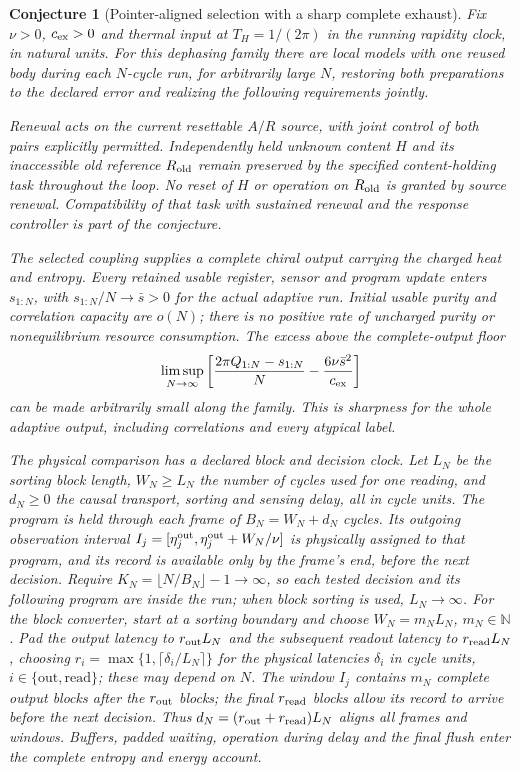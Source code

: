 \documentclass[12pt,a4paper]{article}
\newtheorem{conjecture}[theorem]{Conjecture}
\begin{document}
\begin{conjecture}[Pointer-aligned selection with a sharp complete exhaust]
\label{conj:gravitating}
Fix $\nu>0$, $c_{\rm ex}>0$ and thermal input at $T_H=1/(2\pi)$ in the
running rapidity clock, in natural units. For this dephasing family there
are local models with one reused body during each $N$-cycle run, for
arbitrarily large $N$, restoring both preparations to the declared error
and realizing the following requirements jointly.

Renewal acts on the current resettable $A/R$ source, with joint control
of both pairs explicitly permitted. Independently held unknown content
$H$ and its inaccessible old reference $R_{\rm old}$ remain preserved
by the specified content-holding task throughout the loop. No reset of
$H$ or operation on $R_{\rm old}$ is granted by source renewal.
Compatibility of that task with sustained renewal and the response
controller is part of the conjecture.

The selected coupling supplies a complete chiral output carrying the
charged heat and entropy. Every retained usable register, sensor and
program update enters $s_{1:N}$, with $s_{1:N}/N\to\bar s>0$ for the
actual adaptive run. Initial usable purity and correlation capacity are
$o(N)$; there is no positive rate of uncharged purity or nonequilibrium
resource consumption. The excess above the complete-output floor
\begin{equation}
 \limsup_{N\to\infty}\left[
 \frac{2\pi Q_{1:N}-s_{1:N}}{N}
 -\frac{6\nu\bar s^2}{c_{\rm ex}}\right]
 \label{eq:sharp-exhaust}
\end{equation}
can be made arbitrarily small along the family. This is sharpness for
the whole adaptive output, including correlations and every atypical label.

The physical comparison has a declared block and decision clock.
Let $L_N$ be the sorting block length, $W_N\ge L_N$ the number of
cycles used for one reading, and $d_N\ge0$ the causal transport,
sorting and sensing delay, all in cycle units. The program is held
through each frame of $B_N=W_N+d_N$ cycles. Its outgoing observation
interval $I_j=[\eta_j^{\rm out},\eta_j^{\rm out}+W_N/\nu]$ is physically
assigned to that program, and its record is available only by the
frame's end, before the next decision. Require
$K_N=\lfloor N/B_N\rfloor-1\to\infty$, so each tested decision and
its following program are inside the run; when block sorting is used,
$L_N\to\infty$. For the block converter, start at a sorting boundary
and choose $W_N=m_NL_N$, $m_N\in\mathbb N$. Pad the output latency to $r_{\rm out}L_N$
and the subsequent readout latency to $r_{\rm read}L_N$, choosing
$r_i=\max\{1,\lceil\delta_i/L_N\rceil\}$ for the physical latencies
$\delta_i$ in cycle units, $i\in\{\mathrm{out},\mathrm{read}\}$; these may depend on $N$.
The window $I_j$ contains $m_N$ complete output blocks after the
$r_{\rm out}$ blocks; the final $r_{\rm read}$ blocks allow its record
to arrive before the next decision. Thus
$d_N=(r_{\rm out}+r_{\rm read})L_N$ aligns all frames and windows.
Buffers, padded waiting, operation during delay and the final flush
enter the complete entropy and energy account.


\end{conjecture}
\end{document}
